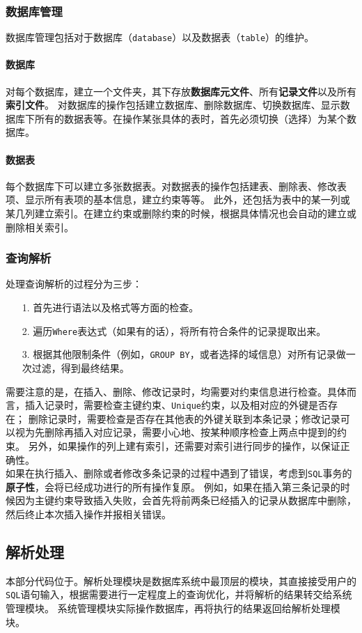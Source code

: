 \documentclass[11pt]{article}
\begin{document}
\subsubsection{数据库管理}
数据库管理包括对于数据库（\texttt{database}）以及数据表（\texttt{table}）的维护。
\paragraph{数据库} 对每个数据库，建立一个文件夹，其下存放\textbf{数据库元文件}、所有\textbf{记录文件}以及所有\textbf{索引文件}。
对数据库的操作包括建立数据库、删除数据库、切换数据库、显示数据库下所有的数据表等。在操作某张具体的表时，首先必须切换（选择）为某个数据库。
\paragraph{数据表} 每个数据库下可以建立多张数据表。对数据表的操作包括建表、删除表、修改表项、显示所有表项的基本信息，建立约束等等。
此外，还包括为表中的某一列或某几列建立索引。在建立约束或删除约束的时候，根据具体情况也会自动的建立或删除相关索引。
\subsubsection{查询解析}
处理查询解析的过程分为三步：
\begin{enumerate}
    \item[1.] 首先进行语法以及格式等方面的检查。
    \item[2.] 遍历\texttt{Where}表达式（如果有的话），将所有符合条件的记录提取出来。
    \item[3.] 根据其他限制条件（例如，\texttt{GROUP BY}，或者选择的域信息）对所有记录做一次过滤，得到最终结果。  
\end{enumerate}
需要注意的是，在插入、删除、修改记录时，均需要对约束信息进行检查。具体而言，插入记录时，需要检查主键约束、\texttt{Unique}约束，以及相对应的外键是否存在；
删除记录时，需要检查是否存在其他表的外键关联到本条记录；修改记录可以视为先删除再插入对应记录，需要小心地、按某种顺序检查上两点中提到的约束。
另外，如果操作的列上建有索引，还需要对索引进行同步的操作，以保证正确性。\\

如果在执行插入、删除或者修改多条记录的过程中遇到了错误，考虑到\texttt{SQL}事务的\textbf{原子性}，会将已经成功进行的所有操作复原。
例如，如果在插入第三条记录的时候因为主键约束导致插入失败，会首先将前两条已经插入的记录从数据库中删除，然后终止本次插入操作并报相关错误。
\subsection{解析处理}
本部分代码位于。解析处理模块是数据库系统中最顶层的模块，其直接接受用户的\texttt{SQL}语句输入，根据需要进行一定程度上的查询优化，并将解析的结果转交给系统管理模块。
系统管理模块实际操作数据库，再将执行的结果返回给解析处理模块。
\end{document}
